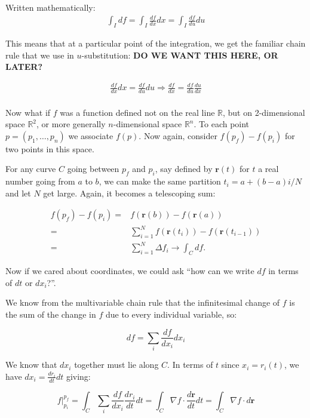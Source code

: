 \documentclass[../master.tex]{subfiles}
\begin{document}
	Written mathematically: 
	\begin{align*}
		\int_I df = \int_I \frac{df}{dx} dx = \int_I \frac{df}{du} du
	\end{align*}
	
	This means that at a particular point of the integration, we get the familiar chain rule that we use in $u$-substitution: \textbf{DO WE WANT THIS HERE, OR LATER?}
	
	\begin{align*}
		\frac{df}{dx} dx =  \frac{df}{du} du \Rightarrow \frac{df}{dx} = \frac{df}{du} \frac{du}{dx}
	\end{align*}
	\\

	
	Now what if $f$ was a function defined not on the real line $\mathbb{R}$, but on 2-dimensional space $\mathbb{R}^2$, or more generally $n$-dimensional space $\mathbb{R}^n$. To each point $p = (p_1, \dots, p_n)$ we associate $f(p)$. Now again, consider $f(p_f)-f(p_i)$ for two points in this space.
	
	For any curve $C$ going between $p_f$ and $p_i$, say defined by $\mathbf r(t)$ for $t$ a real number going from $a$ to $b$, we can make the same partition $t_i = a + (b-a)i/N$ and let $N$ get large. Again, it becomes a telescoping sum:
	
	\begin{align*}
		f(p_f) - f(p_i) = &f(\mathbf r(b)) - f(\mathbf r(a)) \\= & \sum_{i=1}^N f(\mathbf r(t_{i}))-f(\mathbf r(t_{i-1})) \\ = & \sum_{i=1}^N \Delta f_i  \rightarrow \int_C df.
	\end{align*}
	
	Now if we cared about coordinates, we could ask ``how can we write $df$ in terms of $dt$ or $dx_i$?''. 
	
	We know from the multivariable chain rule that the infinitesimal change of $f$ is the sum of the change in $f$ due to every individual variable, so: 
	
	\begin{equation}
		df = \sum_i \frac{df}{dx_i} dx_i
	\end{equation}
	
	We know that $dx_i$ together must lie along $C$. In terms of $t$ since $x_i = r_i (t)$, we have $dx_i = \frac{dr_i}{dt} dt$ giving:
	
	\begin{equation}
		f\rvert^{p_f}_{p_i} = \int_C \sum_i \frac{df}{dx_i} \frac{dr_i}{dt} dt = \int_C \nabla f \cdot \frac{d \mathbf r}{dt} dt =  \int_C \nabla f \cdot d \mathbf r
	\end{equation}
	
\end{document}
